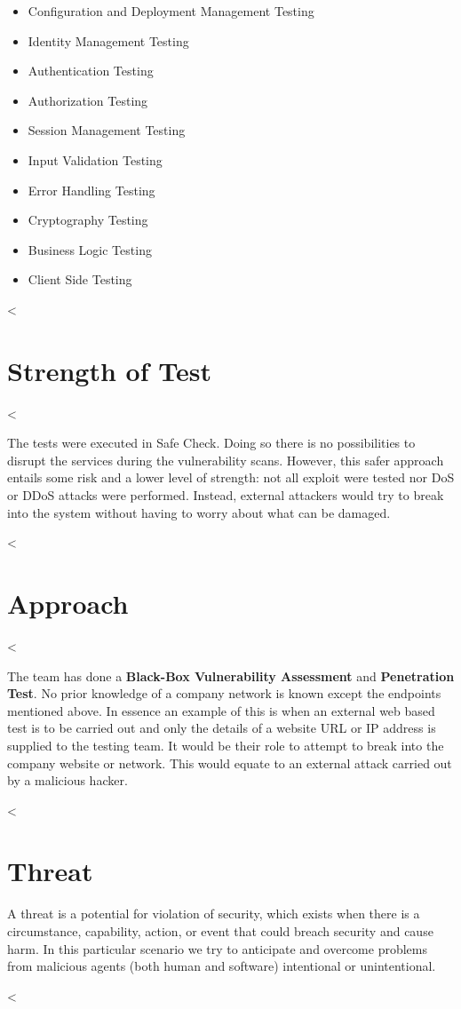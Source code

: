     \begin{itemize}
      \item Configuration and Deployment Management Testing
      \item Identity Management Testing
      \item Authentication Testing
      \item Authorization Testing
      \item Session Management Testing
      \item Input Validation Testing
      \item Error Handling Testing
      \item Cryptography Testing
      \item Business Logic Testing
      \item Client Side Testing
    \end{itemize}

  <%
  \section{Strength of Test}\label{sec:strength-test}

    <%

    The tests were executed in Safe Check. Doing so there is no possibilities to
    disrupt the services during the vulnerability scans.
    However, this safer approach entails some risk and a lower level of
    strength: not all exploit were tested nor DoS or DDoS attacks were
    performed.
    Instead, external attackers would try to break into the system without
    having to worry about what can be damaged.

  <%
  \section{Approach}\label{sec:approach}

    <%

    The team has done a \textbf{Black-Box Vulnerability Assessment} and
    \textbf{Penetration Test}.
    No prior knowledge of a company network is known except the endpoints
    mentioned above.
    In essence an example of this is when an external web based test is to be
    carried out and only the details of a website URL or IP address is supplied
    to the testing team.
    It would be their role to attempt to break into the company website or
    network.
    This would equate to an external attack carried out by a malicious hacker.

  <%
  \section{Threat}\label{sec:threat}

    A threat is a potential for violation of security, which exists when there
    is a circumstance, capability, action, or event that could breach security
    and cause harm.
    In this particular scenario we try to anticipate and overcome problems from
    malicious agents (both human and software) intentional or unintentional.


<%
